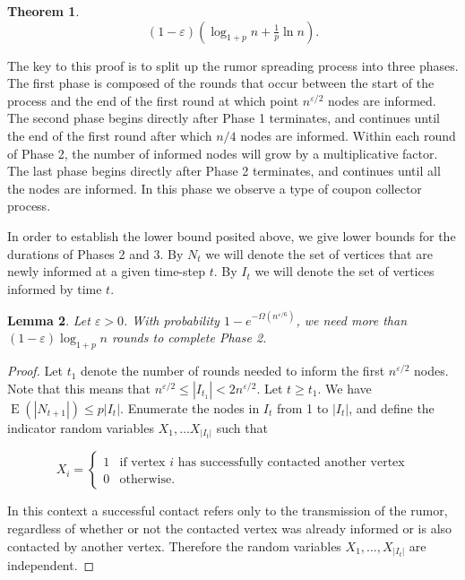 \documentclass[12pt]{article}
\newtheorem{theorem}{Theorem}
\newtheorem{lemma}[theorem]{Lemma}
\newcommand{\e}{\varepsilon}
\DeclareMathOperator{\E}{E}
\begin{document}
{\begin{theorem}
\begin{equation*}
(1-\e)\left(\log_{1+p}n+\tfrac{1}{p}\ln n\right).
\end{equation*}

\end{theorem}

The key to this proof is to split up the rumor spreading process into three phases. The first phase is composed of the rounds that occur between the start of the process and the end of the first round at which point $n^{\e/2}$ nodes are informed. The second phase begins directly after Phase 1 terminates, and continues until the end of the first round after which $n/4$ nodes are informed. Within each round of Phase 2, the number of informed nodes will grow by a multiplicative factor. The last phase begins directly after Phase 2 terminates, and continues until all the nodes are informed. In this phase we observe a type of coupon collector process.

In order to establish the lower bound posited above, we give lower bounds for the durations of Phases 2 and 3. 
By $N_t$ we will denote the set of vertices that are newly informed at a given time-step $t$. 
By $I_t$ we will denote the set of vertices informed by time $t$.


\begin{lemma}\label{RandomPhase2}
Let $\e > 0$. With probability $1-e^{-\Omega(n^{\e/6})}$, we need more than $(1-\e)\log_{1+p}n$ rounds to complete Phase 2.
\end{lemma}

\begin{proof}
Let $t_1$ denote the number of rounds needed to inform the first $n^{\e/2}$ nodes. Note that this means that $n^{\e/2} \leq |I_{t_1}| < 2n^{\e/2}$. Let $t \geq t_1$. We have $\E(|N_{t+1}|)\leq p|I_t|$. Enumerate the nodes in $I_t$ from 1 to $|I_t|$, and define the indicator random variables $X_1,\dots X_{|I_t|}$ such that

\begin{equation*}
X_i = \begin{cases}
       1 &\mbox{if vertex }i\mbox{ has successfully contacted another vertex}\\
       0 &\mbox{otherwise.}
      \end{cases}
\end{equation*}


In this context a successful contact refers only to the transmission of the rumor, regardless of whether or not the contacted vertex was already informed or is also contacted by another vertex. 
Therefore the random variables $X_1,\dots , X_{|I_t|}$ are independent.


\end{proof}}
\end{document}
